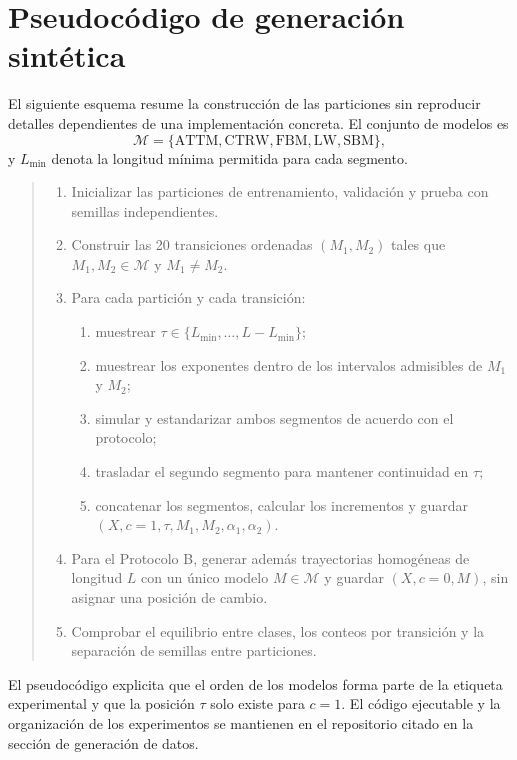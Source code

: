 \documentclass[a4paper,12pt]{article}
\newcommand{\Mset}{\mathcal{M}}
\begin{document}
\appendix

\section{Pseudocódigo de generación sintética}
\label{app:generation-pseudocode}

El siguiente esquema resume la construcción de las particiones sin reproducir detalles dependientes de una implementación concreta. El conjunto de modelos es
\[
  \Mset=\{\mathrm{ATTM},\mathrm{CTRW},\mathrm{FBM},\mathrm{LW},\mathrm{SBM}\},
\]
y $L_{\min}$ denota la longitud mínima permitida para cada segmento.

\begin{quote}
\small
\begin{enumerate}
  \item Inicializar las particiones de entrenamiento, validación y prueba con semillas independientes.
  \item Construir las 20 transiciones ordenadas $(M_1,M_2)$ tales que $M_1,M_2\in\Mset$ y $M_1\neq M_2$.
  \item Para cada partición y cada transición:
  \begin{enumerate}
    \item muestrear $\tau\in\{L_{\min},\ldots,L-L_{\min}\}$;
    \item muestrear los exponentes dentro de los intervalos admisibles de $M_1$ y $M_2$;
    \item simular y estandarizar ambos segmentos de acuerdo con el protocolo;
    \item trasladar el segundo segmento para mantener continuidad en $\tau$;
    \item concatenar los segmentos, calcular los incrementos y guardar $(X,c=1,\tau,M_1,M_2,\alpha_1,\alpha_2)$.
  \end{enumerate}
  \item Para el Protocolo B, generar además trayectorias homogéneas de longitud $L$ con un único modelo $M\in\Mset$ y guardar $(X,c=0,M)$, sin asignar una posición de cambio.
  \item Comprobar el equilibrio entre clases, los conteos por transición y la separación de semillas entre particiones.
\end{enumerate}
\end{quote}

El pseudocódigo explicita que el orden de los modelos forma parte de la etiqueta experimental y que la posición $\tau$ solo existe para $c=1$. El código ejecutable y la organización de los experimentos se mantienen en el repositorio citado en la sección de generación de datos.
\end{document}
